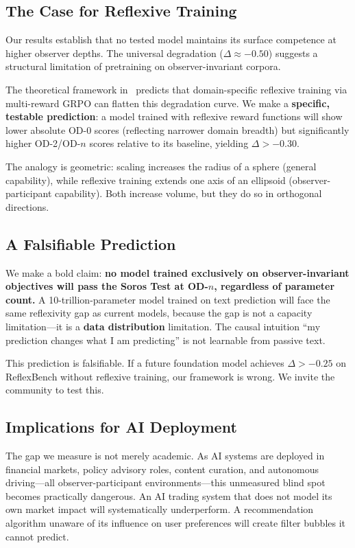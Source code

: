 \documentclass{article}
\begin{document}
\subsection{The Case for Reflexive Training}

Our results establish that no tested model maintains its surface competence at higher observer depths. The universal degradation ($\Delta \approx -0.50$) suggests a structural limitation of pretraining on observer-invariant corpora.

The theoretical framework in~\citep{zhang2026} predicts that domain-specific reflexive training via multi-reward GRPO can flatten this degradation curve. We make a \textbf{specific, testable prediction}: a model trained with reflexive reward functions will show lower absolute OD-0 scores (reflecting narrower domain breadth) but significantly higher OD-2/OD-$n$ scores relative to its baseline, yielding $\Delta > -0.30$.

The analogy is geometric: scaling increases the radius of a sphere (general capability), while reflexive training extends one axis of an ellipsoid (observer-participant capability). Both increase volume, but they do so in orthogonal directions.

\subsection{A Falsifiable Prediction}

We make a bold claim: \textbf{no model trained exclusively on observer-invariant objectives will pass the Soros Test at OD-$n$, regardless of parameter count.} A 10-trillion-parameter model trained on text prediction will face the same reflexivity gap as current models, because the gap is not a capacity limitation---it is a \textbf{data distribution} limitation. The causal intuition ``my prediction changes what I am predicting'' is not learnable from passive text.

This prediction is falsifiable. If a future foundation model achieves $\Delta > -0.25$ on ReflexBench without reflexive training, our framework is wrong. We invite the community to test this.

\subsection{Implications for AI Deployment}

The gap we measure is not merely academic. As AI systems are deployed in financial markets, policy advisory roles, content curation, and autonomous driving---all observer-participant environments---this unmeasured blind spot becomes practically dangerous. An AI trading system that does not model its own market impact will systematically underperform. A recommendation algorithm unaware of its influence on user preferences will create filter bubbles it cannot predict.
\end{document}
